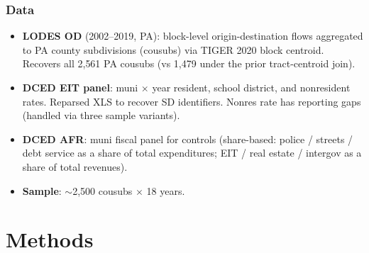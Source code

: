 \documentclass[xcolor = x11names, compress, aspectratio = 169]{beamer}
\begin{document}
    \begin{frame}
    \frametitle{Data}
        \footnotesize
        \begin{itemize}\setlength{\itemsep}{0.10cm}
            \item \textbf{LODES OD} (2002--2019, PA): block-level
            origin-destination flows aggregated to PA county subdivisions
            (cousubs) via TIGER 2020 block centroid. Recovers all
            2{,}561 PA cousubs (vs 1{,}479 under the prior tract-centroid join).
            \item \textbf{DCED EIT panel}: muni $\times$ year resident,
            school district, and nonresident rates. Reparsed XLS to
            recover SD identifiers. Nonres rate has reporting gaps
            (handled via three sample variants).
            \item \textbf{DCED AFR}: muni fiscal panel for controls
            (share-based: police / streets / debt service as a share of
            total expenditures; EIT / real estate / intergov as a share
            of total revenues).
            \item \textbf{Sample}: $\sim$2{,}500 cousubs $\times$ 18 years.
        \end{itemize}
    \end{frame}

\section{Methods}
\end{document}
